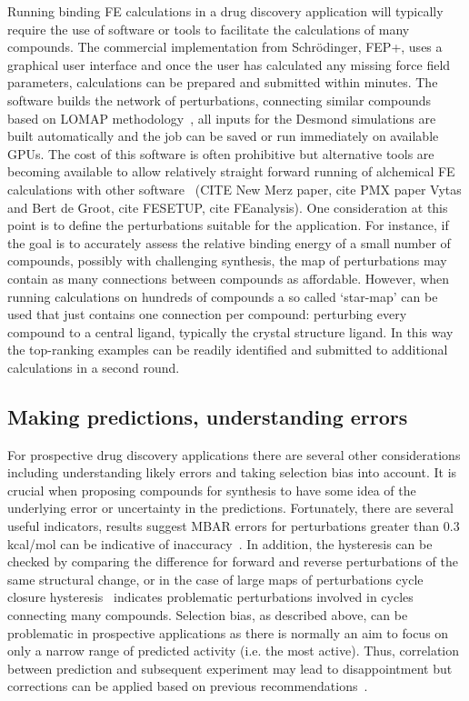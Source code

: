 \documentclass[9pt,bestpractices]{livecoms}
\begin{document}
Running binding FE calculations in a drug discovery application will typically require the use of software or tools to facilitate the calculations of many compounds. The commercial implementation from Schr\"{o}dinger, FEP+, uses a graphical user interface and once the user has calculated any missing force field parameters, calculations can be prepared and submitted within minutes. The software builds the network of perturbations, connecting similar compounds based on LOMAP methodology~\cite{liu2013lead}, all inputs for the Desmond simulations are built automatically and the job can be saved or run immediately on available GPUs. The cost of this software is often prohibitive but alternative tools are becoming available to allow relatively straight forward running of alchemical FE calculations with other software~\cite{gapsys2015pmx, loeffler2015fesetup} (CITE New Merz paper, cite PMX paper Vytas and Bert de Groot, cite FESETUP, cite FEanalysis). One consideration at this point is to define the perturbations suitable for the application. For instance, if the goal is to accurately assess the relative binding energy of a small number of compounds, possibly with challenging synthesis, the map of perturbations may contain as many connections between compounds as affordable. However, when running calculations on hundreds of compounds a so called ‘star-map’ can be used that just contains one connection per compound: perturbing every compound to a central ligand, typically the crystal structure ligand. In this way the top-ranking examples can be readily identified and submitted to additional calculations in a second round. 
%
\subsection*{Making predictions, understanding errors}
For prospective drug discovery applications there are several other considerations including understanding likely errors and taking selection bias into account. It is crucial when proposing compounds for synthesis to have some idea of the underlying error or uncertainty in the predictions. Fortunately, there are several useful indicators, results suggest MBAR errors for perturbations greater than 0.3 kcal/mol can be indicative of inaccuracy~\cite{perez-benito2019predicting}. In addition, the hysteresis can be checked by comparing the difference for forward and reverse perturbations of the same structural change, or in the case of large maps of perturbations cycle closure hysteresis~\cite{wang2013modeling} indicates problematic perturbations involved in cycles connecting many compounds. Selection bias, as described above, can be problematic in prospective applications as there is normally an aim to focus on only a narrow range of predicted activity (i.e. the most active). Thus, correlation between prediction and subsequent experiment may lead to disappointment but corrections can be applied based on previous recommendations~\cite{abel2017critical}. 
%
\end{document}

